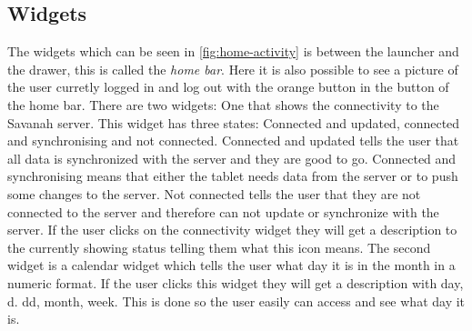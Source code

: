 \subsection{Widgets}

The widgets which can be seen in \autoref{fig:home-activity} is between the launcher and the drawer, this is called the \textit{home bar}. Here it is also possible to see a picture of the user curretly logged in and log out with the orange button in the button of the home bar. There are two widgets: One that shows the connectivity to the Savanah server. This widget has three states: Connected and updated, connected and synchronising and not connected. Connected and updated tells the user that all data is synchronized with the server and they are good to go. Connected and synchronising means that either the tablet needs data from the server or to push some changes to the server. Not connected tells the user that they are not connected to the server and therefore can not update or synchronize with the server. 
If the user clicks on the connectivity widget they will get a description to the currently showing status telling them what this icon means.
The second widget is a calendar widget which tells the user what day it is in the month in a numeric format. If the user clicks this widget they will get a description with day, d. dd, month, week. This is done so the user easily can access and see what day it is.


\begin{lstlisting}[style=sourceCode, language=JAVA, caption=This is code, label=lst:homeActivity] 

\end{lstlisting}